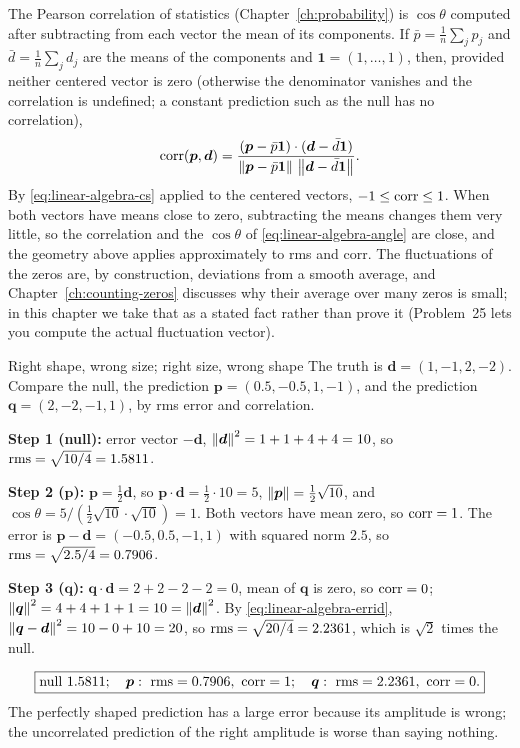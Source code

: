 The Pearson correlation of statistics (Chapter~\ref{ch:probability}) is $\cos\theta$ computed after subtracting from each vector the mean of its components. If $\bar p=\frac1n\sum_jp_j$ and $\bar d=\frac1n\sum_jd_j$ are the means of the components and $\bm 1=(1,\dots,1)$, then, provided neither centered vector is zero (otherwise the denominator vanishes and the correlation is undefined; a constant prediction such as the null has no correlation),
\begin{equation}
\mathrm{corr}(\bm p,\bm d)=\frac{(\bm p-\bar p\bm 1)\cdot(\bm d-\bar d\bm 1)}{\left\lVert \bm p-\bar p\bm 1\right\rVert\,\left\lVert \bm d-\bar d\bm 1\right\rVert} .
\label{eq:linear-algebra-corr}
\end{equation}
By \cref{eq:linear-algebra-cs} applied to the centered vectors, $-1\le\mathrm{corr}\le1$. When both vectors have means close to zero, subtracting the means changes them very little, so the correlation and the $\cos\theta$ of \cref{eq:linear-algebra-angle} are close, and the geometry above applies approximately to rms and corr. The fluctuations of the zeros are, by construction, deviations from a smooth average, and Chapter~\ref{ch:counting-zeros} discusses why their average over many zeros is small; in this chapter we take that as a stated fact rather than prove it (Problem~25 lets you compute the actual fluctuation vector).

\begin{sample}{Right shape, wrong size; right size, wrong shape}
The truth is $\bm d=(1,-1,2,-2)$. Compare the null, the prediction $\bm p=(0.5,-0.5,1,-1)$, and the prediction $\bm q=(2,-2,-1,1)$, by rms error and correlation.

\textbf{Step 1 (null):} error vector $-\bm d$, $\left\lVert \bm d\right\rVert^2=1+1+4+4=10$, so $\mathrm{rms}=\sqrt{10/4}=1.5811$.

\textbf{Step 2 ($\bm p$):} $\bm p=\tfrac12\bm d$, so $\bm p\cdot\bm d=\tfrac12\cdot10=5$, $\left\lVert \bm p\right\rVert=\tfrac12\sqrt{10}$, and $\cos\theta=5/(\tfrac12\sqrt{10}\cdot\sqrt{10})=1$. Both vectors have mean zero, so $\mathrm{corr}=1$. The error is $\bm p-\bm d=(-0.5,0.5,-1,1)$ with squared norm $2.5$, so $\mathrm{rms}=\sqrt{2.5/4}=0.7906$.

\textbf{Step 3 ($\bm q$):} $\bm q\cdot\bm d=2+2-2-2=0$, mean of $\bm q$ is zero, so $\mathrm{corr}=0$; $\left\lVert \bm q\right\rVert^2=4+4+1+1=10=\left\lVert \bm d\right\rVert^2$. By \cref{eq:linear-algebra-errid}, $\left\lVert \bm q-\bm d\right\rVert^2=10-0+10=20$, so $\mathrm{rms}=\sqrt{20/4}=2.2361$, which is $\sqrt2$ times the null.

\[
\boxed{\text{null } 1.5811;\quad \bm p:\ \rms=0.7906,\ \corr=1;\quad \bm q:\ \rms=2.2361,\ \corr=0.}
\]
The perfectly shaped prediction has a large error because its amplitude is wrong; the uncorrelated prediction of the right amplitude is worse than saying nothing.
\end{sample}

